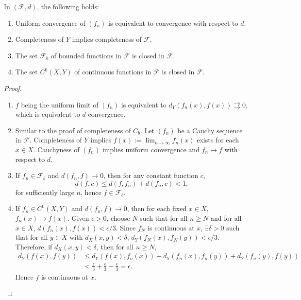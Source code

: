 \begin{prop}
    In $(\mathcal F, d)$, the following holds:
    \begin{enumerate}[label=(\alph*)]
        \item Uniform convergence of $(f_n)$ is equivalent to convergence with respect to $d$.
        \item Completeness of $Y$ implies completeness of $\mathcal F$.
        \item The set $\mathcal F_b$ of bounded functions in $\mathcal F$ is closed in $\mathcal F$.
        \item The set $C^0(X, Y)$ of continuous functions in $\mathcal F$ is closed in $\mathcal F$.
    \end{enumerate}
    \begin{proof}
        \nobreakspace
        \begin{enumerate}[label=(\alph*)]
            \item $f$ being the uniform limit of $(f_n)$ is equivalent to $d_Y(f_n(x), f(x)) \rightrightarrows 0$, which is equivalent to $d$-convergence.
            \item Similar to the proof of completeness of $C_b$. Let $(f_n)$ be a Cauchy sequence in $\mathcal F$. Completeness of $Y$ implies $f(x) := \lim_{n \to \infty} f_n(x)$ exists for each $x \in X$. Cauchyness of $(f_n)$ implies uniform convergence and $f_n \to f$ with respect to $d$.
            \item If $f_n \in \mathcal F_b$ and $d(f_n, f) \to 0$, then for any constant function $c$,
            \[
            d(f, c) \leq d(f, f_n) + d(f_n, c) < 1,
            \]
            for sufficiently large $n$, hence $f \in \mathcal F_b$.
            \item If $f_n \in C^0(X, Y)$ and $d(f_n, f) \to 0$, then for each fixed $x \in X$, $f_n(x) \to f(x)$. Given $\epsilon > 0$, choose $N$ such that for all $n \geq N$ and for all $x \in X$, $d(f_n(x), f(x)) < \epsilon/3$. Since $f_N$ is continuous at $x$, $\exists \delta > 0$ such that for all $y \in X$ with $d_X(x, y) < \delta$, $d_Y(f_N(x), f_N(y)) < \epsilon/3$. Therefore, if $d_X(x, y) < \delta$, then for all $n \geq N$,
            \begin{align*}
                d_Y(f(x), f(y)) &\leq d_Y(f(x), f_n(x)) + d_Y(f_n(x), f_n(y)) + d_Y(f_n(y), f(y)) \\
                &< \frac{\epsilon}{3} + \frac{\epsilon}{3} + \frac{\epsilon}{3} = \epsilon.
            \end{align*}
            Hence $f$ is continuous at $x$.
        \end{enumerate}
    \end{proof}
\end{prop}

